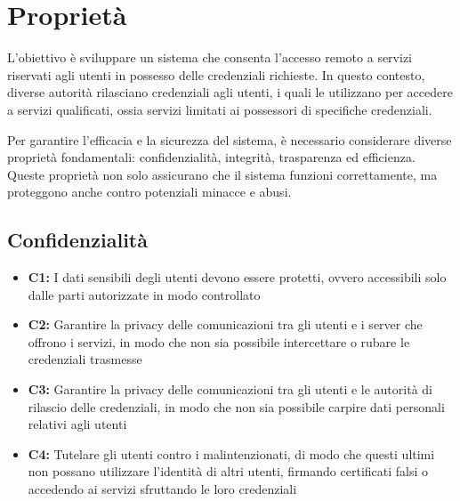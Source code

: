     
    \section{Proprietà}
        L'obiettivo è sviluppare un sistema che consenta l'accesso remoto a servizi riservati agli utenti in possesso delle credenziali richieste.
        In questo contesto, diverse autorità rilasciano credenziali agli utenti, i quali le utilizzano per accedere a servizi qualificati, ossia servizi limitati ai possessori di specifiche credenziali.
        
        Per garantire l'efficacia e la sicurezza del sistema, è necessario considerare diverse proprietà fondamentali: confidenzialità, integrità, trasparenza ed efficienza.
        Queste proprietà non solo assicurano che il sistema funzioni correttamente, ma proteggono anche contro potenziali minacce e abusi.
        
        \subsection{Confidenzialità}
            \begin{itemize}
                \item \textbf{C1:} I dati sensibili degli utenti devono essere protetti, ovvero accessibili solo dalle parti autorizzate in modo controllato
                
                \item \textbf{C2:} Garantire la privacy delle comunicazioni tra gli utenti e i server che offrono i servizi, in modo che non sia possibile intercettare o rubare le credenziali trasmesse
    
                \item \textbf{C3:} Garantire la privacy delle comunicazioni tra gli utenti e le autorità di rilascio delle credenziali, in modo che non sia possibile carpire dati personali relativi agli utenti
                
                \item \textbf{C4:} Tutelare gli utenti contro i malintenzionati, di modo che questi ultimi non possano utilizzare l'identità di altri utenti, firmando certificati falsi o accedendo ai servizi sfruttando le loro credenziali
            \end{itemize}
    
